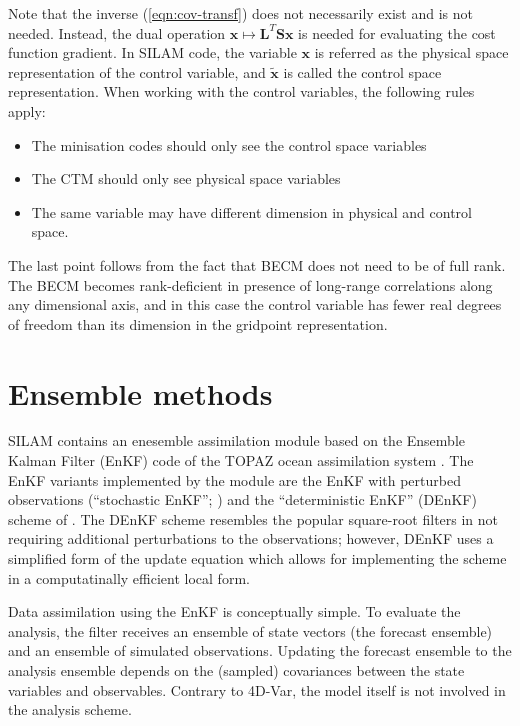 \documentclass[a4paper]{article}
\begin{document}
Note that the inverse (\ref{eqn:cov-transf}) does not necessarily exist and is not
needed. Instead, the dual operation $\mathbf{x} \mapsto \mathbf{L}^T\mathbf{Sx}$ is needed
for evaluating the cost function gradient. In SILAM code, the variable $\mathbf{x}$ is
referred as the physical space representation of the control variable, and
$\mathbf{\tilde{x}}$ is called the control space representation. When working with the
control variables, the following rules apply:
\begin{itemize}
\item The minisation codes should only see the control space variables
\item The CTM should only see physical space variables 
\item The same variable may have different dimension in physical and control space.
\end{itemize}
The last point follows from the fact that BECM does not need to be of full rank. The BECM
becomes rank-deficient in presence of long-range correlations along any dimensional axis,
and in this case the control variable has fewer real degrees of freedom than its dimension
in the gridpoint representation.

\section{Ensemble methods}

SILAM contains an enesemble assimilation module based on the Ensemble Kalman Filter (EnKF)
code of the TOPAZ ocean assimilation system \citep{Sakov2012}. The EnKF variants
implemented by the module are the EnKF with perturbed observations (``stochastic EnKF'';
\cite{Burgers1998}) and the ``deterministic EnKF'' (DEnKF) scheme of
\cite{Sakov2008a}. The DEnKF scheme resembles the popular square-root filters
\cite{Hunt2007} in not requiring additional perturbations to the observations; however,
DEnKF uses a simplified form of the update equation which allows for implementing the
scheme in a computatinally efficient local form.

Data assimilation using the EnKF is conceptually simple. To evaluate the analysis, the
filter receives an ensemble of state vectors (the forecast ensemble) and an ensemble of
simulated observations. Updating the forecast ensemble to the analysis ensemble depends on
the (sampled) covariances between the state variables and observables. Contrary to 4D-Var,
the model itself is not involved in the analysis scheme.
\end{document}
